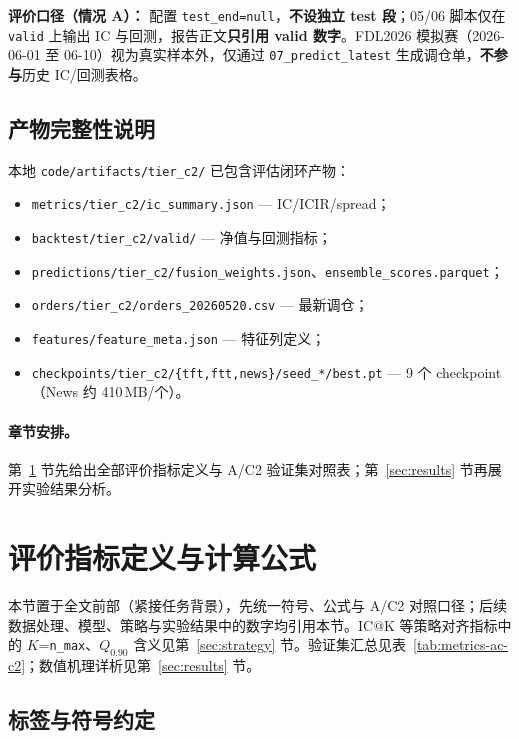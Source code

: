 \documentclass[UTF8,a4paper,12pt]{ctexart}
\begin{document}
\textbf{评价口径（情况 A）：} 配置 \texttt{test\_end=null}，\textbf{不设独立 test 段}；05/06 脚本仅在 \texttt{valid} 上输出 IC 与回测，报告正文\textbf{只引用 valid 数字}。FDL2026 模拟赛（2026-06-01 至 06-10）视为真实样本外，仅通过 \texttt{07\_predict\_latest} 生成调仓单，\textbf{不参与}历史 IC/回测表格。

\subsection{产物完整性说明}

本地 \texttt{code/artifacts/tier\_c2/} 已包含评估闭环产物：
\begin{itemize}[leftmargin=2em]
  \item \texttt{metrics/tier\_c2/ic\_summary.json} — IC/ICIR/spread；
  \item \texttt{backtest/tier\_c2/valid/} — 净值与回测指标；
  \item \texttt{predictions/tier\_c2/fusion\_weights.json}、\texttt{ensemble\_scores.parquet}；
  \item \texttt{orders/tier\_c2/orders\_20260520.csv} — 最新调仓；
  \item \texttt{features/feature\_meta.json} — 特征列定义；
  \item \texttt{checkpoints/tier\_c2/\{tft,ftt,news\}/seed\_*/best.pt} — 9 个 checkpoint（News 约 410\,MB/个）。
\end{itemize}

\paragraph{章节安排。} 第~\ref{sec:metrics} 节先给出全部评价指标定义与 A/C2 验证集对照表；第~\ref{sec:results} 节再展开实验结果分析。

\section{评价指标定义与计算公式}
\label{sec:metrics}

本节置于全文前部（紧接任务背景），先统一符号、公式与 A/C2 对照口径；后续数据处理、模型、策略与实验结果中的数字均引用本节。IC@K 等策略对齐指标中的 $K$=\texttt{n\_max}、$Q_{0.90}$ 含义见第~\ref{sec:strategy} 节。验证集汇总见表~\ref{tab:metrics-ac-c2}；数值机理详析见第~\ref{sec:results} 节。

\subsection{标签与符号约定}
\end{document}
